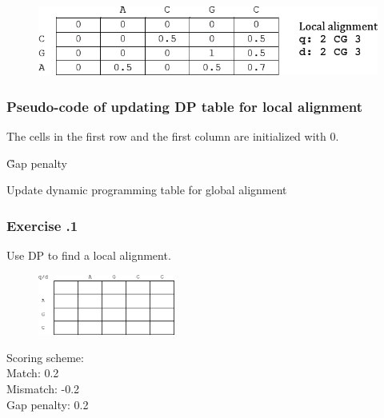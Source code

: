 \begin{figure}[H]
  \centering
      \includegraphics[width=0.7 \textwidth]{fig04/local_alignment_backtrack.png}
\end{figure}

\medskip 

%
%
\subsubsection*{Pseudo-code of updating DP table for local alignment}
The cells in the first row and the first column are initialized with 0.

\begin{algorithm}[H]
  
  \BlankLine
    
  \G{Gap penalty}
  
  \BlankLine \BlankLine
  
  
  \BlankLine \BlankLine
    
  
  \caption{Update dynamic programming table for global alignment}

\end{algorithm}

%
%
\subsubsection*{Exercise \thesection.1}
	
Use DP to find a local alignment.

\begin{multicols}{2}
\begin{figure}[H]
  \centering
      \includegraphics[width=0.4\textwidth]{fig04/local_alignment_exercise.png}
\end{figure}

\noindent Scoring scheme: \\ 
\null \quad Match: 0.2 \\ 
\null \quad Mismatch: -0.2 \\ 
\null \quad Gap penalty: 0.2

\end{multicols} 

\bigskip 

%
